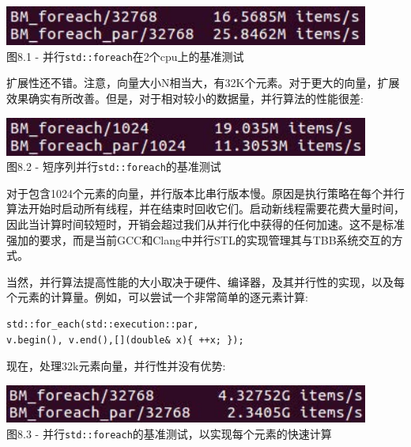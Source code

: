 \begin{center}
\includegraphics[width=0.9\textwidth]{content/2/chapter8/images/1.jpg}\\
图8.1 - 并行\texttt{std::foreach}在2个cpu上的基准测试
\end{center}

扩展性还不错。注意，向量大小N相当大，有32K个元素。对于更大的向量，扩展效果确实有所改善。但是，对于相对较小的数据量，并行算法的性能很差:

\begin{center}
\includegraphics[width=0.9\textwidth]{content/2/chapter8/images/2.jpg}\\
图8.2 - 短序列并行\texttt{std::foreach}的基准测试
\end{center}

对于包含1024个元素的向量，并行版本比串行版本慢。原因是执行策略在每个并行算法开始时启动所有线程，并在结束时回收它们。启动新线程需要花费大量时间，因此当计算时间较短时，开销会超过我们从并行化中获得的任何加速。这不是标准强加的要求，而是当前GCC和Clang中并行STL的实现管理其与TBB系统交互的方式。 

当然，并行算法提高性能的大小取决于硬件、编译器，及其并行性的实现，以及每个元素的计算量。例如，可以尝试一个非常简单的逐元素计算:

\begin{lstlisting}[style=styleCXX]
std::for_each(std::execution::par,
v.begin(), v.end(),[](double& x){ ++x; });
\end{lstlisting}

现在，处理32k元素向量，并行性并没有优势:

\begin{center}
\includegraphics[width=0.9\textwidth]{content/2/chapter8/images/3.jpg}\\
图8.3 - 并行\texttt{std::foreach}的基准测试，以实现每个元素的快速计算
\end{center}

